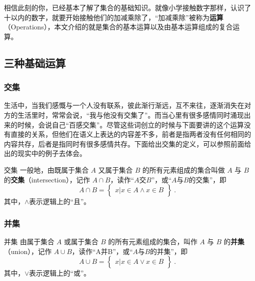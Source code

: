
\begin{issues}
\issueDraft
\end{issues}
相信此刻的你，已经基本了解了集合的基础知识。就像小学接触数字那样，认识了十以内的数字，就要开始接触他们的加减乘除了，“加减乘除”被称为\textbf{运算}（Operations），本文介绍的就是集合的基本运算以及由基本运算组成的复合运算。

\subsection{三种基础运算}

\subsubsection{交集}

生活中，当我们感慨与一个人没有联系，彼此渐行渐远，互不来往，逐渐消失在对方的生活里时，常常会说，“我与他没有交集了”。而当心里有很多感情同时涌现出来的时候，会说自己“百感交集”。尽管这些词创立的时候与下面要讲的这个运算没有直接的关系，但他们在语义上表达的内容差不多，前者是指两者没有任何相同的内容共存，后者是指同时有很多感情共存。下面给出交集的定义，可以参照前面给出的现实中的例子去体会。

\begin{definition}{交集}
一般地，由既属于集合 $A$ 又属于集合 $B$ 的所有元素组成的集合叫做 $A$ 与 $B$ 的\textbf{交集}（intersection），记作 $A \cap B$，读作“$A$交$B$”，或“$A$与$B$的交集”，即
\begin{equation}
A\cap B = \begin{Bmatrix} x|x\in A\land x\in B \end{Bmatrix}~.
\end{equation}
其中，$\land$表示逻辑上的“且”。
\end{definition}


\subsubsection{并集}
\begin{definition}{并集}
由属于集合 $A$ 或属于集合 $B$ 的所有元素组成的集合，叫作 $A$ 与 $B$ 的\textbf{并集}（union），记作 $A\cup B$，读作“A并B”，或“$A$与$B$的并集”，即
\begin{equation}
A\cup B = \begin{Bmatrix}x|x\in A \lor x\in B\end{Bmatrix}~.
\end{equation}
其中，$\lor$表示逻辑上的“或”。
\end{definition}


